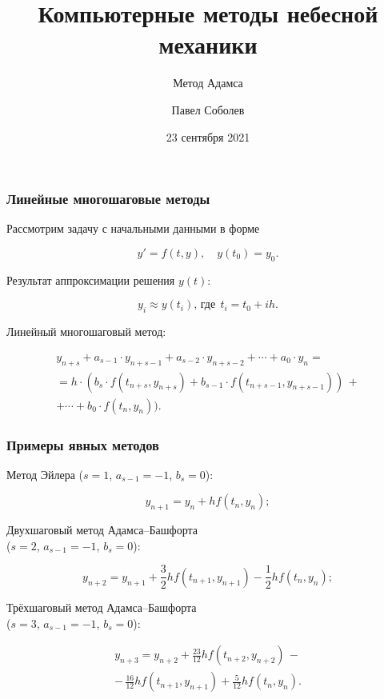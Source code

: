 


\title{Компьютерные методы небесной механики}
\subtitle{Метод Адамса}
\author{Павел Соболев}
\date{23 сентября 2021}



\frame{\titlepage}

\begin{frame}
\frametitle{Линейные многошаговые методы}
Рассмотрим задачу с начальными данными в форме

\su
\begin{equation}
  y' = f(t, y), \quad y(t_0) = y_0.
\end{equation}

Результат аппроксимации решения $ y(t) $:

\su
\begin{equation}
  y_i \approx y(t_i), \, \text{где} \;\, t_i = t_0 + ih.
\end{equation}

Линейный многошаговый метод:

\su
\begin{equation}
\begin{gathered}
  y_{n+s} + a_{s-1} \cdot y_{n+s-1} + a_{s-2} \cdot y_{n+s-2} + \cdots + a_0 \cdot y_n = \\
  = h \cdot (b_s \cdot f(t_{n+s}, y_{n+s}) + b_{s-1} \cdot f(t_{n+s-1}, y_{n+s-1})) \, + \\
  + \cdots + b_0 \cdot f(t_n, y_n)).
\end{gathered}
\end{equation}

\end{frame}

\begin{frame}
\frametitle{Примеры явных методов}

Метод Эйлера ($s = 1$, $a_{s-1} = -1$, $b_s = 0$):

\su
\begin{equation}
  y_{n+1} = y_n + h f(t_n, y_n);
\end{equation}

Двухшаговый метод Адамса--Башфорта \\
($s = 2$, $a_{s-1} = -1$, $b_s = 0$):

\su
\begin{equation}
  y_{n+2} = y_{n+1} + \frac{3}{2} h f(t_{n+1}, y_{n+1}) - \frac{1}{2} h f(t_n, y_n);
\end{equation}

Трёхшаговый метод Адамса--Башфорта \\
($s = 3$, $a_{s-1} = -1$, $b_s = 0$):

\su
\begin{equation}
\begin{gathered}
  y_{n+3} = y_{n+2} + \frac{23}{12} h f(t_{n+2}, y_{n+2}) \, - \\
  - \, \frac{16}{12} h f(t_{n+1}, y_{n+1}) + \frac{5}{12} h f(t_n, y_n).
\end{gathered}
\end{equation}

\end{frame}

